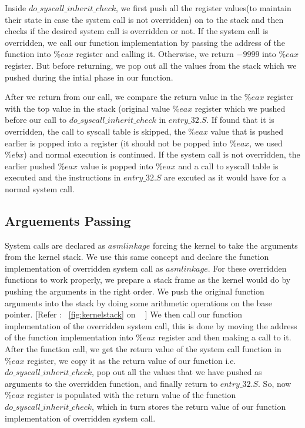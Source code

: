 \documentclass[11pt]{article}
\begin{document}
Inside $do\_syscall\_inherit\_check$, we first push all the register values(to
maintain their state in case the system call is not overridden) on to
the stack and then checks if the desired system call is overridden or not. 
If the system call is overridden, we call our function implementation by passing the
address of the function into $\%eax$ register and calling it.
Otherwise, we return $-9999$ into $\%eax$ register. But before returning,
we pop out all the values from the stack which we pushed during the intial phase in our function.

After we return from our call, we compare the return value in the $\%eax$ register with the top value in the stack
(original value $\%eax$ register which we pushed before our call to  $do\_syscall\_inherit\_check$
in $entry\_32.S$. If found that it is overridden, the call to syscall table is skipped, the $\%eax$ value that is
pushed earlier is popped into a register (it should not be popped into $\%eax$, we used $\%ebx$) and normal execution
is continued.  If the system call is not overridden, the earlier pushed  $\%eax$
value is popped into $\%eax$ and a call to syscall table is executed and
the instructions in $entry\_32.S$ are excuted as it would have for a normal system
call.

\subsection{Arguements Passing}

System calls are declared as $asmlinkage$ forcing the kernel to take the arguments from the kernel stack. We use this
same concept and declare the function implementation of overridden system call
as $asmlinkage$. For these overridden functions to work properly, we
prepare a stack frame as the kernel would do by pushing the arguments
in the right order. We push the original function arguments into the
stack by doing some arithmetic operations on the base pointer. [Refer : ~\ref{fig:kernelstack} on ~\pageref{fig:kernelstack} ]
We then call our function implementation of the overridden system call, this is done by moving the
address of the function implementation into $\%eax$ register and then making a call to it. 
After the function call, we get the return value of the system call function in $\%eax$ register,
 we copy it as the return value of our function i.e. $do\_syscall\_inherit\_check$, pop out all the values that we have pushed as
arguments to the overridden function, and finally return to $entry\_32.S$. So, now $\%eax$ register is populated with the
return value of the function $do\_syscall\_inherit\_check$, which in turn stores the return value of our function implementation of overridden system call.
\end{document}
